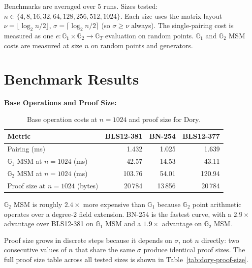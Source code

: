 Benchmarks are averaged over 5 runs. Sizes tested:
$n \in \{4, 8, 16, 32, 64, 128, 256, 512, 1024\}$.
Each size uses the matrix layout
$\nu = \lfloor \log_2 n / 2 \rfloor$,
$\sigma = \lceil \log_2 n / 2 \rceil$ (so $\sigma \geq \nu$ always).
The single-pairing cost is measured as one
$e : \mathbb{G}_1 \times \mathbb{G}_2 \to \mathbb{G}_T$ evaluation on random
points. $\mathbb{G}_1$ and $\mathbb{G}_2$ MSM costs are measured at size $n$
on random points and generators.

\section{Benchmark Results}

\textbf{Base Operations and Proof Size:}

\begin{table}[H]
\centering
\caption{Base operation costs at $n = 1024$ and proof size for Dory.}
\label{tab:dory-base}
\begin{tabular}{lrrr}
\toprule
\textbf{Metric} & \textbf{BLS12-381} & \textbf{BN-254} & \textbf{BLS12-377} \\
\midrule
Pairing (ms)                           & 1.432  & 1.025  & 1.639  \\
$\mathbb{G}_1$ MSM at $n=1024$ (ms)   & 42.57  & 14.53  & 43.11  \\
$\mathbb{G}_2$ MSM at $n=1024$ (ms)   & 103.76 & 54.01  & 120.94 \\
Proof size at $n=1024$ (bytes)         & 20\,784 & 13\,856 & 20\,784 \\
\bottomrule
\end{tabular}
\end{table}

$\mathbb{G}_2$ MSM is roughly $2.4\times$ more expensive than $\mathbb{G}_1$
because $\mathbb{G}_2$ point arithmetic operates over a degree-2 field
extension. BN-254 is the fastest curve, with a $2.9\times$ advantage over
BLS12-381 on $\mathbb{G}_1$ MSM and a $1.9\times$ advantage on
$\mathbb{G}_2$ MSM.

Proof size grows in discrete steps because it depends on $\sigma$, not $n$
directly: two consecutive values of $n$ that share the same $\sigma$ produce
identical proof sizes. The full proof size table across all tested sizes is
shown in Table~\ref{tab:dory-proof-size}.

